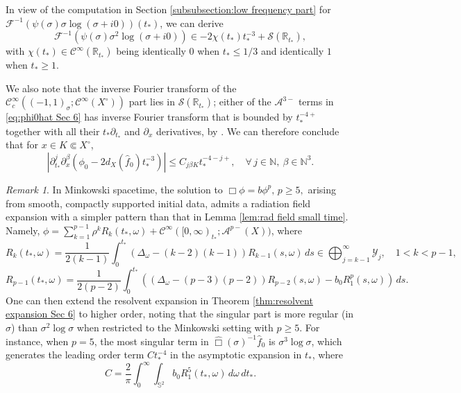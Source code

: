 \documentclass[10pt,a4paper,reqno]{amsart}
\newcommand{\CI}{\mathcal{C}^\infty}
\newcommand{\CcI}{\mathcal{C}_c^\infty}
\newcommand{\RR}{\mathbb{R}}
\newcommand{\A}{\mathcal{A}}
\newcommand{\pa}{\partial}
\theoremstyle{definition}
\theoremstyle{remark}
\newtheorem{remark}[theorem]{Remark}
\numberwithin{equation}{section}
\newcommand{\calF}{\mathcal F}
\newcommand{\ts}{t_*}
\newcommand{\wh}{\widehat}
\begin{document}
\noindent
In view of the computation in Section \ref{subsubsection:low frequency part} for $\calF^{-1}(\psi(\sigma)\sigma\log(\sigma+i0))(\ts)$, we can derive 
\[
    \calF^{-1}(\psi(\sigma)\sigma^2\log(\sigma+i0)) \in -2\chi(\ts)\ts^{-3} + \mathscr{S}(\RR_{\ts}),
\]
with $\chi(\ts)\in\CI(\RR_{\ts})$ being identically $0$ when $\ts\leq 1/3$ and identically $1$ when $\ts\geq 1$.

\noindent
We also note that the inverse Fourier transform of the $\CcI((-1,1)_\sigma;\CI(X^\circ))$ part lies in $\mathscr{S}(\RR_{\ts})$; either of the $\A^{3-}$ terms in \eqref{eq:phi0hat Sec 6} has inverse Fourier transform that is bounded by $t_*^{-4+}$ together with all their  $t_*\pa_{\ts}$ and $\pa_x$ derivatives, by \cite[Lemma 3.6]{Hin22}. We can therefore conclude that for $x\in K\Subset X^\circ$,
\begin{equation}
\label{phi0 asymp Sec 6}
    |\pa_{\ts}^j \pa_x^\beta (\phi_0 - 2d_X(\wh{f}_0) t_*^{-3})|\leq C_{j\beta K} t_*^{-4-j+},\quad \forall\, j\in\mathbb{N},\ \beta\in\mathbb{N}^3.
\end{equation} 

\begin{remark}
\label{remark:Minkowski techs} 
In Minkowski spacetime, the solution to $\Box\phi=b\phi^p, \, p \geq 5,$ arising from smooth, compactly supported initial data, admits a radiation field expansion with a simpler pattern than that in Lemma \ref{lem:rad field small time}. Namely, $\phi = \sum_{k=1}^{p-1} \rho^k R_k(t_*,\omega) + \CI([0,\infty)_{t_*};\A^{p-}(X))$, where
\[
    R_k(t_*,\omega) = \frac{1}{2(k-1)}\int_0^{t_*}(\Delta_\omega - (k-2)(k-1))R_{k-1}(s,\omega)\,ds \in \bigoplus_{j=k-1}^\infty \mathcal{Y}_j,\quad 1< k< p-1,  
\]
\[
    R_{p-1}(t_*,\omega) = \frac{1}{2(p-2)} \int_0^{t_*} ((\Delta_\omega-(p-3)(p-2))R_{p-2}(s,\omega) -b_0 R_1^p(s,\omega))\,ds.
\]
One can then extend the resolvent expansion in Theorem \ref{thm:resolvent expansion Sec 6} to higher order, noting that the singular part is more regular (in $\sigma$) than $\sigma^2\log\sigma$ when restricted to the Minkowski setting with $p\geq 5$. For instance, when $p=5$, the most singular term in $\wh\Box(\sigma)^{-1}\wh{f}_0$ is $\sigma^3\log\sigma$, which generates the leading order term $Ct_*^{-4}$ in the asymptotic expansion in $t_*$, where
\[
    C= \frac{2}{\pi}\int_0^\infty  \int_{\mathbb{S}^2} b_0 R_1^5(t_*,\omega) \,d\omega\,dt_*.
\]
\end{remark}
\end{document}

